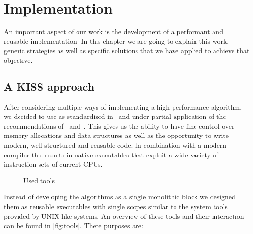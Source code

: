 \chapter{Implementation}
\label{ch:implementation}

An important aspect of our work is the development of a performant and reusable implementation. In this chapter we are going to explain this work, generic strategies as well as specific solutions that we have applied to achieve that objective.



\section{A KISS approach}
\label{sec:implementation:approach}

After considering multiple ways of implementing a high-performance algorithm, we decided to use  as standardized in~\cite{cpp14} and under partial application of the recommendations of~\cite{effective_cpp} and~\cite{effective_cpp2}. This gives us the ability to have fine control over memory allocations and data structures as well as the opportunity to write modern, well-structured and reusable code. In combination with a modern compiler this results in native executables that exploit a wide variety of instruction sets of current CPUs.

\begin{sidewaysfigure}
    \centering
    
    \caption{Used tools}\label{fig:tools}
\end{sidewaysfigure}

Instead of developing the algorithms as a single monolithic block we designed them as reusable executables with single scopes similar to the system tools provided by UNIX-like systems. An overview of these tools and their interaction can be found in \autoref{fig:tools}. There purposes are:

